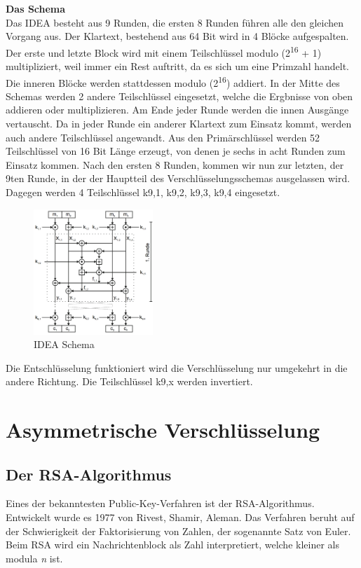 \documentclass[11pt]{scrartcl}
\begin{document}
\noindent \textbf{Das Schema}\\
Das IDEA besteht aus 9 Runden, die ersten 8 Runden führen alle den gleichen Vorgang aus. Der Klartext, bestehend aus 64 Bit wird in 4 Blöcke aufgespalten. Der erste und letzte Block wird mit einem Teilschlüssel modulo (2\textsuperscript{16} + 1) multipliziert, weil immer ein Rest auftritt, da es sich um eine Primzahl handelt. Die inneren Blöcke werden stattdessen modulo (2\textsuperscript{16}) addiert. In der Mitte des Schemas werden 2 andere Teilschlüssel eingesetzt, welche die Ergbnisse von oben addieren oder multiplizieren. Am Ende jeder Runde werden die innen Ausgänge vertauscht. Da in jeder Runde ein anderer Klartext zum Einsatz kommt, werden auch andere Teilschlüssel angewandt. \grqq{} Aus den Primärschlüssel werden 52 Teilschlüssel von 16 Bit Länge erzeugt, von denen je sechs in acht Runden zum Einsatz kommen.\grqq{}\cite{6}
Nach den ersten 8 Runden, kommen wir nun zur letzten, der 9ten Runde, in der der Hauptteil des Verschlüsselungsschemas ausgelassen wird. Dagegen werden 4 Teilschlüssel k{\scriptsize 9,1}, k{\scriptsize 9,2}, k{\scriptsize 9,3}, k{\scriptsize 9,4} eingesetzt. \cite{3}\cite{6}
\begin{figure}[H]
\includegraphics[width=0.40\textwidth]{Bilder/IDEA/IDEA_Schema}
	\caption{IDEA Schema \cite{3}}
	\label{fig11}
\end{figure}
\noindent
Die Entschlüsselung funktioniert wird die Verschlüsselung nur umgekehrt in die andere Richtung. Die Teilschlüssel k{\scriptsize 9,x} werden invertiert. \cite{3}

\section{Asymmetrische Verschlüsselung}
\label{sec:asymetric-ciphering}

\subsection{Der RSA-Algorithmus}
\label{sec:rsa-algorithmus}
Eines der bekanntesten Public-Key-Verfahren ist der RSA-Algorithmus. Entwickelt wurde es 1977 von Rivest, Shamir, Aleman. Das Verfahren beruht auf der Schwierigkeit der Faktorisierung von Zahlen, der sogenannte Satz von Euler. Beim RSA wird ein Nachrichtenblock als Zahl interpretiert, welche kleiner als modula \textit{n} ist. \cite{2}
\end{document}
